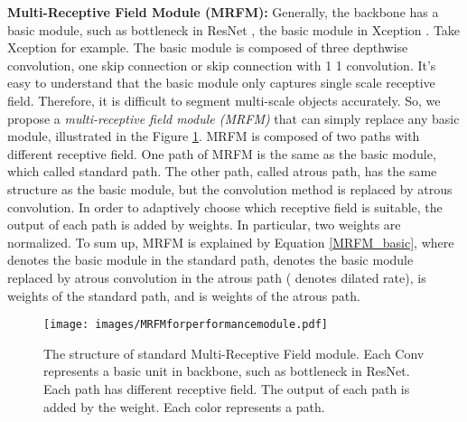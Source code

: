 \documentclass[final]{cvpr}
\begin{document}
\textbf{Multi-Receptive Field Module (MRFM):} Generally, the backbone has a basic module, such as bottleneck in ResNet \cite{ResNet}, the basic module in Xception \cite{Xception}. Take Xception for example. The basic module is composed of three depthwise convolution, one skip connection or skip connection with 1  1 convolution. It's easy to understand that the basic module only captures single scale receptive field. Therefore, it is difficult to segment multi-scale objects accurately. So, we propose a \emph{multi-receptive field module (MRFM)} that can simply replace any basic module, illustrated in the Figure \ref{MRFMforperformancemodule}. MRFM is composed of two paths with different receptive field. One path of MRFM is the same as the basic module, which called standard path. The other path, called atrous path, has the same structure as the basic module, but the convolution method is replaced by atrous convolution. In order to adaptively choose which receptive field is suitable, the output of each path is added by weights. In particular, two weights are normalized. To sum up, MRFM is explained by Equation \ref{MRFM_basic}, where  denotes the basic module in the standard path,  denotes the basic module replaced by atrous convolution in the atrous path ( denotes dilated rate),  is weights of the standard path, and  is weights of the atrous path.




\begin{figure}[ht]
\centering
\texttt{[image: images/MRFMforperformancemodule.pdf]}
\caption{The structure of standard Multi-Receptive Field module. Each Conv represents a basic unit in backbone, such as bottleneck in ResNet. Each path has different receptive field. The output of each path is added by the weight. Each color represents a path.}
\label{MRFMforperformancemodule}
\end{figure}
\end{document}
